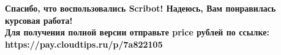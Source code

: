 \begin{{center}}
    \topskip=0pt
    \vspace*{{\fill}}
    \textbf{{
        Спасибо, что воспользовались Scribot! Надеюсь, Вам понравилась курсовая работа!\\
        Для получения полной версии отправьте {price} рублей по ссылке:\\
        https://pay.cloudtips.ru/p/7a822105\\
    }}
\end{{center}}